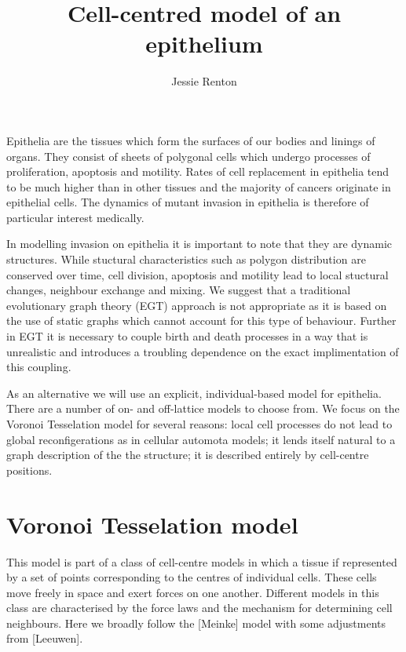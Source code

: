 \documentclass[a4paper]{article}
\title{Cell-centred model of an epithelium}
\author{Jessie Renton}
\begin{document}
 
\maketitle

Epithelia are the tissues which form the surfaces of our bodies and linings of organs. They consist of sheets of polygonal cells which undergo processes of proliferation, apoptosis and motility. Rates of cell replacement in epithelia tend to be much higher than in other tissues and the majority of cancers originate in epithelial cells. The dynamics of mutant invasion in epithelia is therefore of particular interest medically.

In modelling invasion on epithelia it is important to note that they are dynamic structures. While stuctural characteristics such as polygon distribution are conserved over time, cell division, apoptosis and motility lead to local stuctural changes, neighbour exchange and mixing. We suggest that a traditional evolutionary graph theory (EGT) approach is not appropriate as it is based on the use of static graphs which cannot account for this type of behaviour. Further in EGT it is necessary to couple birth and death processes in a way that is unrealistic and introduces a troubling dependence on the exact implimentation of this coupling. 

As an alternative we will use an explicit, individual-based model for epithelia. There are a number of on- and off-lattice models to choose from. We focus on the Voronoi Tesselation model for several reasons: local cell processes do not lead to global reconfigerations as in cellular automota models; it lends itself natural to a graph description of the the structure; it is described entirely by cell-centre positions.

\section{Voronoi Tesselation model}

This model is part of a class of cell-centre models in which a tissue if represented by a set of points corresponding to the centres of individual cells. These cells move freely in space and exert forces on one another. Different models in this class are characterised by the force laws and the mechanism for determining cell neighbours. Here we broadly follow the [Meinke] model with some adjustments from [Leeuwen].
\end{document}
